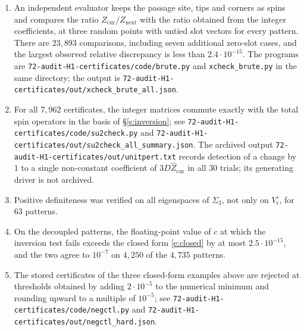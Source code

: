 \begin{enumerate}
\item An independent evaluator keeps the passage site, tips and corners as spins and compares the ratio $Z_{\mathrm{cur}}/Z_{\mathrm{next}}$ with the ratio obtained from the integer coefficients, at three random points with untied slot vectors for every pattern. There are $23{,}893$ comparisons, including seven additional zero-slot cases, and the largest observed relative discrepancy is less than $2.4\cdot10^{-15}$. The programs are \texttt{72-audit-H1-certificates/\allowbreak code/\allowbreak brute.py} and \texttt{xcheck\_\allowbreak brute.py} in the same directory; the output is \texttt{72-audit-H1-certificates/\allowbreak out/\allowbreak xcheck\_\allowbreak brute\_\allowbreak all.json}.
\item For all $7{,}962$ certificates, the integer matrices commute exactly with the total spin operators in the basis of \S\ref{s:inversion}; see \texttt{72-audit-H1-certificates/\allowbreak code/\allowbreak su2check.py} and \texttt{72-audit-H1-certificates/\allowbreak out/\allowbreak su2check\_\allowbreak all\_\allowbreak summary.json}. The archived output \texttt{72-audit-H1-certificates/\allowbreak out/\allowbreak unitpert.txt} records detection of a change by $1$ to a single non-constant coefficient of $3D\hat Z_{\mathrm{cur}}$ in all $30$ trials; its generating driver is not archived.
\item Positive definiteness was verified on all eigenspaces of $\Sigma_3$, not only on $V_\epsilon^{\circ}$, for $63$ patterns.
\item On the decoupled patterns, the floating-point value of $c$ at which the inversion test fails exceeds the closed form \eqref{e:closed} by at most $2.5 \cdot 10^{-15}$, and the two agree to $10^{-7}$ on $4{,}250$ of the $4{,}735$ patterns.
\item The stored certificates of the three closed-form examples above are rejected at thresholds obtained by adding $2\cdot10^{-5}$ to the numerical minimum and rounding upward to a multiple of $10^{-5}$; see \texttt{72-audit-H1-certificates/\allowbreak code/\allowbreak negctl.py} and \texttt{72-audit-H1-certificates/\allowbreak out/\allowbreak negctl\_\allowbreak hard.json}.
\end{enumerate}

